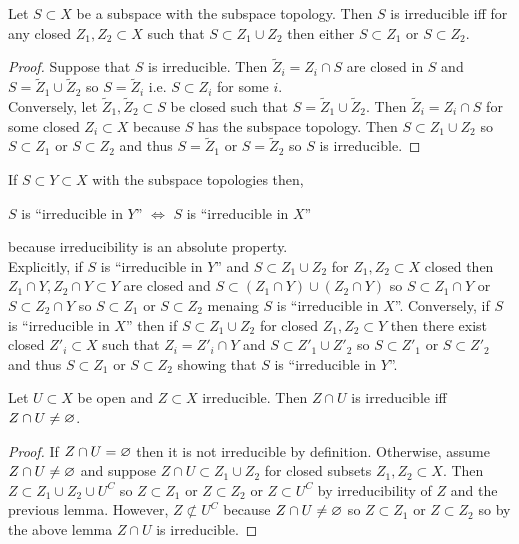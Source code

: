 \documentclass[12pt]{article}
\begin{document}
\begin{lemma}
Let $S \subset X$ be a subspace with the subspace topology. Then $S$ is irreducible iff for any closed $Z_1, Z_2 \subset X$ such that $S \subset Z_1 \cup Z_2$ then either $S \subset Z_1$ or $S \subset Z_2$.
\end{lemma}

\begin{proof}
Suppose that $S$ is irreducible. Then $\tilde{Z}_i = Z_i \cap S$ are closed in $S$ and $S = \tilde{Z}_1 \cup \tilde{Z}_2$ so $S = \tilde{Z}_i$ i.e. $S \subset Z_i$ for some $i$.
\bigskip\\
Conversely, let $\tilde{Z}_1, \tilde{Z}_2 \subset S$ be closed such that $S = \tilde{Z}_1 \cup \tilde{Z}_2$. Then $\tilde{Z}_i = Z_i \cap S$ for some closed $Z_i \subset X$ because $S$ has the subspace topology. Then $S \subset Z_1 \cup Z_2$ so $S \subset Z_1$ or $S \subset Z_2$ and thus $S = \tilde{Z}_1$ or $S = \tilde{Z}_2$ so $S$ is irreducible.
\end{proof}

\begin{rmk}
If $S \subset Y \subset X$ with the subspace topologies then,
\begin{center}
$S$ is ``irreducible in $Y$'' $\iff$ $S$ is ``irreducible in $X$''
\end{center}
because irreducibility is an absolute property.
\bigskip\\
Explicitly, if $S$ is ``irreducible in $Y$'' and $S \subset Z_1 \cup Z_2$ for $Z_1, Z_2 \subset X$ closed then $Z_1 \cap Y, Z_2 \cap Y \subset Y$ are closed and $S \subset (Z_1 \cap Y) \cup (Z_2 \cap Y)$ so $S \subset Z_1 \cap Y$ or $S \subset Z_2 \cap Y$ so $S \subset Z_1$ or $S \subset Z_2$ menaing $S$ is ``irreducible in $X$''. Conversely, if $S$ is ``irreducible in $X$'' then if $S \subset Z_1 \cup Z_2$ for closed $Z_1, Z_2 \subset Y$ then there exist closed $Z'_i \subset X$ such that $Z_i = Z'_i \cap Y$ and $S \subset Z'_1 \cup Z'_2$ so $S \subset Z'_1$ or $S \subset Z'_2$ and thus $S \subset Z_1$ or $S \subset Z_2$ showing that $S$ is ``irreducible in $Y$''.
\end{rmk}

\begin{lemma}
Let $U \subset X$ be open and $Z \subset X$ irreducible. Then $Z \cap U$ is irreducible iff $Z \cap U \neq \varnothing$.
\end{lemma}

\begin{proof}
If $Z \cap U = \varnothing$ then it is not irreducible by definition. Otherwise, assume $Z \cap U \neq \varnothing$ and suppose $Z \cap U \subset Z_1 \cup Z_2$ for closed subsets $Z_1, Z_2 \subset X$. Then $Z \subset Z_1 \cup Z_2 \cup U^C$ so $Z \subset Z_1$ or $Z \subset Z_2$ or $Z \subset U^C$ by irreducibility of $Z$ and the previous lemma. However, $Z \not\subset U^C$ because $Z \cap U \neq \varnothing$ so $Z \subset Z_1$ or $Z \subset Z_2$ so by the above lemma $Z \cap U$ is irreducible.
\end{proof}
\end{document}

